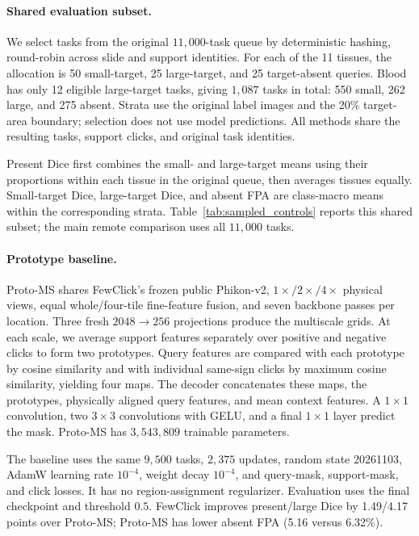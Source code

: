 \paragraph{Shared evaluation subset.}
We select tasks from the original $11{,}000$-task queue by deterministic hashing, round-robin across slide and support identities. For each of the 11 tissues, the allocation is 50 small-target, 25 large-target, and 25 target-absent queries. Blood has only 12 eligible large-target tasks, giving $1{,}087$ tasks in total: 550 small, 262 large, and 275 absent. Strata use the original label images and the 20\% target-area boundary; selection does not use model predictions. All methods share the resulting tasks, support clicks, and original task identities.

Present Dice first combines the small- and large-target means using their proportions within each tissue in the original queue, then averages tissues equally. Small-target Dice, large-target Dice, and absent FPA are class-macro means within the corresponding strata. Table~\ref{tab:sampled_controls} reports this shared subset; the main remote comparison uses all $11{,}000$ tasks.

\paragraph{Prototype baseline.}
Proto-MS shares FewClick's frozen public Phikon-v2, $1\times/2\times/4\times$ physical views, equal whole/four-tile fine-feature fusion, and seven backbone passes per location. Three fresh $2048\!\to\!256$ projections produce the multiscale grids. At each scale, we average support features separately over positive and negative clicks to form two prototypes. Query features are compared with each prototype by cosine similarity and with individual same-sign clicks by maximum cosine similarity, yielding four maps. The decoder concatenates these maps, the prototypes, physically aligned query features, and mean context features. A $1\times1$ convolution, two $3\times3$ convolutions with GELU, and a final $1\times1$ layer predict the mask. Proto-MS has $3{,}543{,}809$ trainable parameters.

The baseline uses the same $9{,}500$ tasks, $2{,}375$ updates, random state 20261103, AdamW learning rate $10^{-4}$, weight decay $10^{-4}$, and query-mask, support-mask, and click losses. It has no region-assignment regularizer. Evaluation uses the final checkpoint and threshold $0.5$. FewClick improves present/large Dice by 1.49/4.17 points over Proto-MS; Proto-MS has lower absent FPA (5.16 versus 6.32\%).

